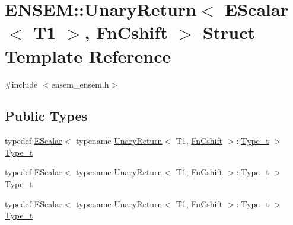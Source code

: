 \hypertarget{structENSEM_1_1UnaryReturn_3_01EScalar_3_01T1_01_4_00_01FnCshift_01_4}{}\section{E\+N\+S\+EM\+:\+:Unary\+Return$<$ E\+Scalar$<$ T1 $>$, Fn\+Cshift $>$ Struct Template Reference}
\label{structENSEM_1_1UnaryReturn_3_01EScalar_3_01T1_01_4_00_01FnCshift_01_4}


{\ttfamily \#include $<$ensem\+\_\+ensem.\+h$>$}

\subsection*{Public Types}
\begin{DoxyCompactItemize}
\item 
typedef \mbox{\hyperlink{classENSEM_1_1EScalar}{E\+Scalar}}$<$ typename \mbox{\hyperlink{structENSEM_1_1UnaryReturn}{Unary\+Return}}$<$ T1, \mbox{\hyperlink{structENSEM_1_1FnCshift}{Fn\+Cshift}} $>$\+::\mbox{\hyperlink{structENSEM_1_1UnaryReturn_3_01EScalar_3_01T1_01_4_00_01FnCshift_01_4_accaabe891d4db03e846c40927db5ad5e}{Type\+\_\+t}} $>$ \mbox{\hyperlink{structENSEM_1_1UnaryReturn_3_01EScalar_3_01T1_01_4_00_01FnCshift_01_4_accaabe891d4db03e846c40927db5ad5e}{Type\+\_\+t}}
\item 
typedef \mbox{\hyperlink{classENSEM_1_1EScalar}{E\+Scalar}}$<$ typename \mbox{\hyperlink{structENSEM_1_1UnaryReturn}{Unary\+Return}}$<$ T1, \mbox{\hyperlink{structENSEM_1_1FnCshift}{Fn\+Cshift}} $>$\+::\mbox{\hyperlink{structENSEM_1_1UnaryReturn_3_01EScalar_3_01T1_01_4_00_01FnCshift_01_4_accaabe891d4db03e846c40927db5ad5e}{Type\+\_\+t}} $>$ \mbox{\hyperlink{structENSEM_1_1UnaryReturn_3_01EScalar_3_01T1_01_4_00_01FnCshift_01_4_accaabe891d4db03e846c40927db5ad5e}{Type\+\_\+t}}
\item 
typedef \mbox{\hyperlink{classENSEM_1_1EScalar}{E\+Scalar}}$<$ typename \mbox{\hyperlink{structENSEM_1_1UnaryReturn}{Unary\+Return}}$<$ T1, \mbox{\hyperlink{structENSEM_1_1FnCshift}{Fn\+Cshift}} $>$\+::\mbox{\hyperlink{structENSEM_1_1UnaryReturn_3_01EScalar_3_01T1_01_4_00_01FnCshift_01_4_accaabe891d4db03e846c40927db5ad5e}{Type\+\_\+t}} $>$ \mbox{\hyperlink{structENSEM_1_1UnaryReturn_3_01EScalar_3_01T1_01_4_00_01FnCshift_01_4_accaabe891d4db03e846c40927db5ad5e}{Type\+\_\+t}}
\end{DoxyCompactItemize}


